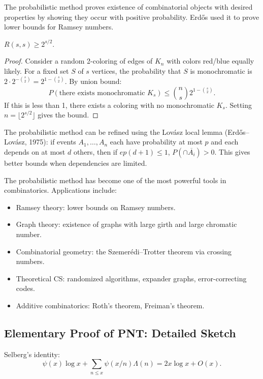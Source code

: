 The probabilistic method proves existence of combinatorial objects with desired properties by showing they occur with positive probability. Erd\H{o}s used it to prove lower bounds for Ramsey numbers.

\begin{theorem}
$R(s,s) \geq 2^{s/2}$.
\end{theorem}

\begin{proof}
Consider a random 2-coloring of edges of $K_n$ with colors red/blue equally likely. For a fixed set $S$ of $s$ vertices, the probability that $S$ is monochromatic is $2 \cdot 2^{-\binom{s}{2}} = 2^{1-\binom{s}{2}}$. By union bound:
\[
P(\text{there exists monochromatic } K_s) \leq \binom{n}{s} 2^{1-\binom{s}{2}}.
\]
If this is less than 1, there exists a coloring with no monochromatic $K_s$. Setting $n = \lfloor 2^{s/2} \rfloor$ gives the bound. \end{proof}

The probabilistic method can be refined using the Lov\'{a}sz local lemma (Erd\H{o}s--Lov\'{a}sz, 1975): if events $A_1, \ldots, A_n$ each have probability at most $p$ and each depends on at most $d$ others, then if $ep(d+1) \leq 1$, $P(\cap \overline{A_i}) > 0$. This gives better bounds when dependencies are limited.

The probabilistic method has become one of the most powerful tools in combinatorics. Applications include:
\begin{itemize}
    \item Ramsey theory: lower bounds on Ramsey numbers.
    \item Graph theory: existence of graphs with large girth and large chromatic number.
    \item Combinatorial geometry: the Szemer\'{e}di--Trotter theorem via crossing numbers.
    \item Theoretical CS: randomized algorithms, expander graphs, error-correcting codes.
    \item Additive combinatorics: Roth's theorem, Freiman's theorem.
\end{itemize}

\subsection{Elementary Proof of PNT: Detailed Sketch}

Selberg's identity:
\[
\psi(x) \log x + \sum_{n \leq x} \psi(x/n) \Lambda(n) = 2x \log x + O(x).
\]


